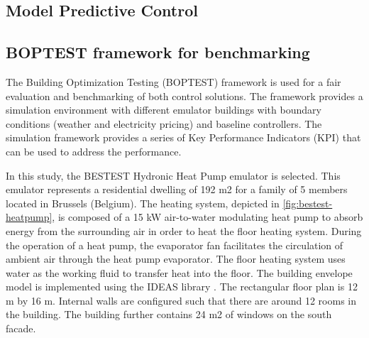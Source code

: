 \subsection{Model Predictive Control}


\newpage
\subsection{BOPTEST framework for benchmarking}
\label{sec:BOPTEST}
The Building Optimization Testing (BOPTEST) framework \cite{Blum2021} is used for a fair evaluation and benchmarking of both control solutions. The framework provides a simulation environment with different emulator buildings with boundary conditions (weather and electricity pricing) and baseline controllers. The simulation framework provides a series of Key Performance Indicators (KPI) that can be used to address the performance.

In this study, the BESTEST Hydronic Heat Pump emulator is selected. This emulator represents a residential dwelling of 192 m2 for a family of 5 members located in Brussels (Belgium).  The heating system, depicted in \ref{fig:bestest-heatpump}, is composed of a 15 kW air-to-water modulating heat pump to absorb energy from the surrounding air in order to heat the floor heating system. During the operation of a heat pump, the evaporator fan facilitates the circulation of ambient air through the heat pump evaporator. The floor heating system uses water as the working fluid to transfer heat into the floor. The building envelope model is implemented using the IDEAS library \cite{Jorissen2018}. The rectangular floor plan is 12 m by 16 m. Internal walls are configured such that there are around 12 rooms in the building. The building further contains 24 m2 of windows on the south facade.

